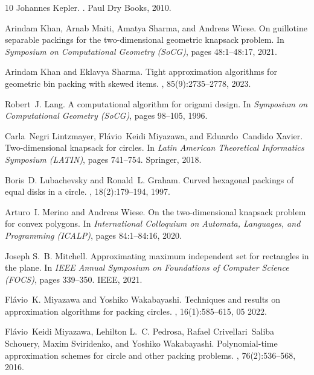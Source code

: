 \documentclass[10pt,a4paper]{article}
\theoremstyle{plain}
\theoremstyle{plain}
\theoremstyle{plain}
\theoremstyle{definition}
\begin{document}
{\begin{thebibliography}{10}
Johannes Kepler.
.
\newblock Paul Dry Books, 2010.

Arindam Khan, Arnab Maiti, Amatya Sharma, and Andreas Wiese.
\newblock On guillotine separable packings for the two-dimensional geometric knapsack problem.
\newblock In {\em Symposium on Computational Geometry (SoCG)}, pages 48:1--48:17, 2021.

Arindam Khan and Eklavya Sharma.
\newblock Tight approximation algorithms for geometric bin packing with skewed items.
, 85(9):2735--2778, 2023.

Robert~J. Lang.
\newblock A computational algorithm for origami design.
\newblock In {\em Symposium on Computational Geometry (SoCG)}, pages 98--105, 1996.

Carla~Negri Lintzmayer, Fl{\'a}vio~Keidi Miyazawa, and Eduardo~Candido Xavier.
\newblock Two-dimensional knapsack for circles.
\newblock In {\em Latin American Theoretical Informatics Symposium (LATIN)}, pages 741--754. Springer, 2018.

Boris~D. Lubachevsky and Ronald~L. Graham.
\newblock Curved hexagonal packings of equal disks in a circle.
, 18(2):179--194, 1997.

Arturo~I. Merino and Andreas Wiese.
\newblock On the two-dimensional knapsack problem for convex polygons.
\newblock In {\em International Colloquium on Automata, Languages, and Programming (ICALP)}, pages 84:1--84:16, 2020.

Joseph S.~B. Mitchell.
\newblock Approximating maximum independent set for rectangles in the plane.
\newblock In {\em IEEE Annual Symposium on Foundations of Computer Science (FOCS)}, pages 339--350. {IEEE}, 2021.

Fl{\'a}vio~K. Miyazawa and Yoshiko Wakabayashi.
\newblock Techniques and results on approximation algorithms for packing circles.
, 16(1):585--615, 05 2022.

Fl{\'{a}}vio~Keidi Miyazawa, Lehilton L.~C. Pedrosa, Rafael Crivellari~Saliba Schouery, Maxim Sviridenko, and Yoshiko Wakabayashi.
\newblock Polynomial-time approximation schemes for circle and other packing problems.
, 76(2):536--568, 2016.


\end{thebibliography}}
\end{document}
